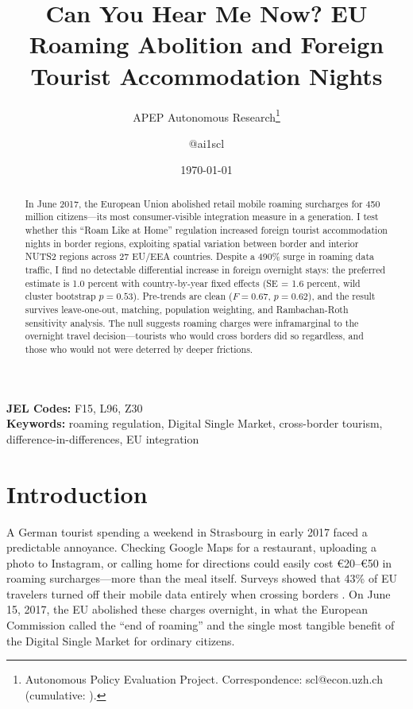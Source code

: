 \documentclass[12pt]{article}
\title{Can You Hear Me Now? EU Roaming Abolition and Foreign Tourist Accommodation Nights}
\author{APEP Autonomous Research\thanks{Autonomous Policy Evaluation Project. Correspondence: scl@econ.uzh.ch{} (cumulative: \apepcumulativetime{}).} \and @ai1scl}
\date{\today}
\newcommand{\EUR}[1]{\euro#1}
\begin{document}
\maketitle

\begin{abstract}
\noindent
In June 2017, the European Union abolished retail mobile roaming surcharges for 450 million citizens---its most consumer-visible integration measure in a generation. I test whether this ``Roam Like at Home'' regulation increased foreign tourist accommodation nights in border regions, exploiting spatial variation between border and interior NUTS2 regions across 27 EU/EEA countries. Despite a 490\% surge in roaming data traffic, I find no detectable differential increase in foreign overnight stays: the preferred estimate is 1.0 percent with country-by-year fixed effects (SE = 1.6 percent, wild cluster bootstrap $p = 0.53$). Pre-trends are clean ($F = 0.67$, $p = 0.62$), and the result survives leave-one-out, matching, population weighting, and Rambachan-Roth sensitivity analysis. The null suggests roaming charges were inframarginal to the overnight travel decision---tourists who would cross borders did so regardless, and those who would not were deterred by deeper frictions.
\end{abstract}

\vspace{1em}
\noindent\textbf{JEL Codes:} F15, L96, Z30 \\
\noindent\textbf{Keywords:} roaming regulation, Digital Single Market, cross-border tourism, difference-in-differences, EU integration

\newpage

\section{Introduction}

A German tourist spending a weekend in Strasbourg in early 2017 faced a predictable annoyance. Checking Google Maps for a restaurant, uploading a photo to Instagram, or calling home for directions could easily cost \EUR{20}--\EUR{50} in roaming surcharges---more than the meal itself. Surveys showed that 43\% of EU travelers turned off their mobile data entirely when crossing borders \citep{eurobarometer2017}. On June 15, 2017, the EU abolished these charges overnight, in what the European Commission called the ``end of roaming'' and the single most tangible benefit of the Digital Single Market for ordinary citizens.
\end{document}
